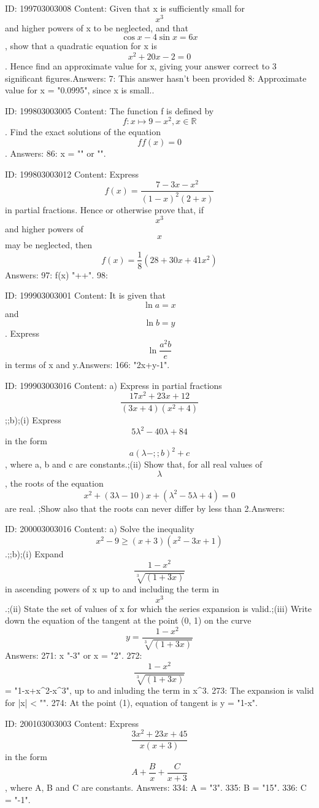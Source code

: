 \documentclass{article}
\begin{document}
ID: 199703003008
Content:
Given that x is sufficiently small for \[x^{3}\] and higher powers of x to be neglected, and that \[\cos x - 4\sin x = 6x\], show that a quadratic equation for x is \[x^{2} + 20x - 2 = 0\]. Hence find an approximate value for x, giving your answer correct to 3 significant figures.Answers:
7: This answer hasn't been provided
8: Approximate value for x = "0.0995", since x is small..

ID: 199803003005
Content:
The function f is defined by $$f : x \mapsto 9 - x^2, x \in \mathbb{R}$$. Find the exact solutions of the equation $$ff(x) = 0$$. Answers:
86: x = \pm""  or \pm"".

ID: 199803003012
Content:
Express $$f(x) = \frac{7 - 3x - x^2}{{( 1 - x )}^2 ( 2 + x )}$$ in partial fractions. Hence or otherwise prove that, if $$x^3$$ and higher powers of $$x$$ may be neglected, then $$f(x) = \frac{1}{8}( 28 + 30x + 41 x^2 )$$Answers:
97: f(x) \equiv "++".
98: 

ID: 199903003001
Content:
It is given that \[\ln a = x\] and \[\ln b = y\]. Express \[\ln \frac {a^2 b}{e}\] in terms of x and y.Answers:
166: \ln {} \equiv "2x+y-1".

ID: 199903003016
Content:
a) Express in partial fractions \[\frac {17x^2 + 23x + 12}{(3x + 4)(x^2 + 4)}\];;b);(i) Express \[5\lambda^2 - 40\lambda + 84\] in the form \[a(\lambda -;;b)^2 + c\], where a, b and c are constants.;(ii) Show that, for all real values of \[\lambda\], the roots of the equation \[x^2 + (3\lambda - 10)x + (\lambda^2 - 5\lambda + 4) = 0\] are real. ;Show also that the roots can never differ by less than 2.Answers:

ID: 200003003016
Content:
a) Solve the inequality \[x^2 - 9 \geq (x + 3) (x^2 -3x + 1)\].;;b);(i) Expand \[\frac{1 - x^2}{\sqrt[3]{(1 + 3x)}}\] in ascending powers of x up to and including the term in \[x^3\].;(ii) State the set of values of x for which the series expansion is valid.;(iii) Write down the equation of the tangent at the point (0, 1) on the curve \[y = \frac{1 - x^2}{\sqrt[3]{(1 + 3x)}}\]Answers:
271: x \leq "-3" or x = "2".
272:  \[\frac{1 - x^2}{\sqrt[3]{(1 + 3x)}}\] = "1-x+x^2-x^3", up to and inluding the term in x^3.
273: The expansion is valid for |x| < "".
274: At the point (1), equation of tangent is y = "1-x".

ID: 200103003003
Content:
Express  $$\frac{3x^2  + 23x + 45}{x( x + 3 )}$$ in the form  $$A + \frac{B}{x} + \frac{C}{x + 3}$$, where A, B and C are constants. Answers:
334: A = "3".
335: B = "15".
336: C = "-1".
\end{document}
